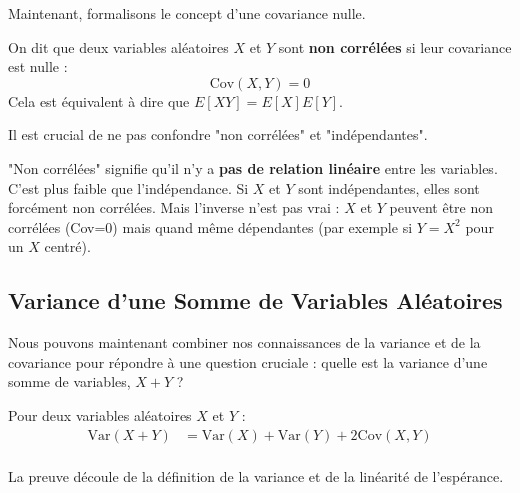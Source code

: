 Maintenant, formalisons le concept d'une covariance nulle.

\begin{definitionbox}
On dit que deux variables aléatoires $X$ et $Y$ sont \textbf{non corrélées} si leur covariance est nulle :
$$\text{Cov}(X,Y) = 0$$
Cela est équivalent à dire que $E[XY] = E[X]E[Y]$.
\end{definitionbox}

Il est crucial de ne pas confondre "non corrélées" et "indépendantes".

\begin{intuitionbox}
"Non corrélées" signifie qu'il n'y a \textbf{pas de relation linéaire} entre les variables. C'est plus faible que l'indépendance. Si $X$ et $Y$ sont indépendantes, elles sont forcément non corrélées. Mais l'inverse n'est pas vrai : $X$ et $Y$ peuvent être non corrélées (Cov=0) mais quand même dépendantes (par exemple si $Y=X^2$ pour un $X$ centré).
\end{intuitionbox}

\subsection{Variance d'une Somme de Variables Aléatoires}

Nous pouvons maintenant combiner nos connaissances de la variance et de la covariance pour répondre à une question cruciale : quelle est la variance d'une somme de variables, $X+Y$ ?

\begin{theorembox}
Pour deux variables aléatoires $X$ et $Y$ :
\begin{align*}
\text{Var}(X+Y) &= \text{Var}(X) + \text{Var}(Y) + 2\text{Cov}(X,Y) \\
\end{align*}
\end{theorembox}

La preuve découle de la définition de la variance et de la linéarité de l'espérance.

